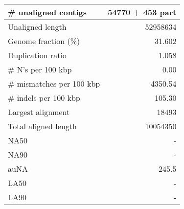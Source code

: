 \documentclass[12pt,a4paper]{article}
\begin{document}
\begin{table}[ht]
\begin{center}
\begin{tabular}{|l*{1}{|r}|}
\# unaligned contigs & 54770 + 453 part \\ \hline
Unaligned length & 52958634 \\ \hline
Genome fraction (\%) & 31.602 \\ \hline
Duplication ratio & 1.058 \\ \hline
\# N's per 100 kbp & 0.00 \\ \hline
\# mismatches per 100 kbp & 4350.54 \\ \hline
\# indels per 100 kbp & 105.30 \\ \hline
Largest alignment & 18493 \\ \hline
Total aligned length & 10054350 \\ \hline
NA50 & - \\ \hline
NA90 & - \\ \hline
auNA & 245.5 \\ \hline
LA50 & - \\ \hline
LA90 & - \\ \hline
\end{tabular}
\end{center}
\end{table}
\end{document}
